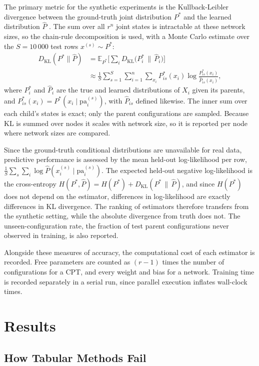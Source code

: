 \documentclass[a4paper,fleqn]{cas-dc}
\newcommand{\KL}{D_{\mathrm{KL}}}
\begin{document}
The primary metric for the synthetic experiments is the Kullback-Leibler divergence between the ground-truth joint distribution $P^*$ and the learned distribution $\hat P$ \citep{koller2009probabilistic}. The sum over all $r^n$ joint states is intractable at these network sizes, so the chain-rule decomposition is used, with a Monte Carlo estimate over the $S=10\,000$ test rows $x^{(s)}\sim P^*$:
\begin{align}
\KL(P^*\|\hat P) &= \mathbb{E}_{P^*}\Big[\sum_{i} \KL\big(P^*_{i}\,\|\,\hat P_{i}\big)\Big] \nonumber\\
&\approx \frac{1}{S}\sum_{s=1}^{S}\sum_{i=1}^{n}\sum_{x_i} P^*_{is}(x_i)\log\frac{P^*_{is}(x_i)}{\hat P_{is}(x_i)},
\end{align}
where $P^*_{i}$ and $\hat P_{i}$ are the true and learned distributions of $X_i$ given its parents, and $P^*_{is}(x_i) = P^*(x_i\mid \mathrm{pa}_i^{(s)})$, with $\hat P_{is}$ defined likewise.
The inner sum over each child's states is exact; only the parent configurations are sampled. Because KL is summed over nodes it scales with network size, so it is reported per node where network sizes are compared.

Since the ground-truth conditional distributions are unavailable for real data, predictive performance is assessed by the mean held-out log-likelihood per row, $\frac{1}{S}\sum_s\sum_i \log\hat P(x_i^{(s)}\mid\mathrm{pa}_i^{(s)})$. The expected held-out negative log-likelihood is the cross-entropy $H(P^*,\hat P) = H(P^*) + \KL(P^*\,\|\,\hat P)$, and since $H(P^*)$ does not depend on the estimator, differences in log-likelihood are exactly differences in KL divergence. The ranking of estimators therefore transfers from the synthetic setting, while the absolute divergence from truth does not. The unseen-configuration rate, the fraction of test parent configurations never observed in training, is also reported.

Alongside these measures of accuracy, the computational cost of each estimator is recorded. Free parameters are counted as $(r-1)$ times the number of configurations for a CPT, and every weight and bias for a network. Training time is recorded separately in a serial run, since parallel execution inflates wall-clock times.

\section{Results}\label{sec:results}

\subsection{How Tabular Methods Fail}
\end{document}
